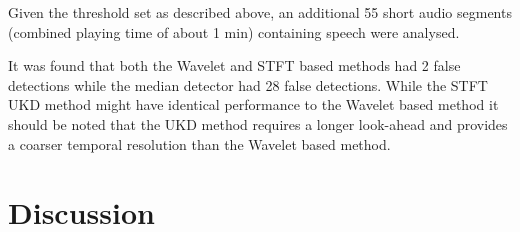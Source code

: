 Given the threshold set as described above, an additional 55 short audio segments (combined playing time of about 1 min) containing speech were analysed.

It was found that both the Wavelet and STFT based methods had 2 false detections while the median detector had 28 false detections. While the STFT UKD method might have identical performance to the Wavelet based method it should be noted that the UKD method requires a longer look-ahead and provides a coarser temporal resolution than the Wavelet based method.

\section{Discussion}






